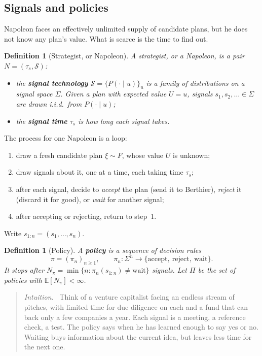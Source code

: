 \documentclass[11pt]{article}
\newcommand{\Nap}{\textcolor{nap}{Napoleon}}
\newcommand{\Ber}{\textcolor{ber}{Berthier}}
\newtheorem{definition}{Definition}
\newtheorem*{definition*}{Definition}
\theoremstyle{remark}
\newenvironment{intuition}{\begin{quote}\small\color{muted}\textit{Intuition.}\ }{\end{quote}}
\newcommand{\E}{\mathbb{E}}
\newcommand{\Scal}{\mathcal{S}}
\newcommand{\accept}{\text{accept}}
\begin{document}
\subsection{Signals and policies}

\Nap{} faces an effectively unlimited supply of candidate plans, but he does not know any plan's value. What is scarce is the time to find out.

\setcounter{definition}{0}\begin{definition}[Strategist, or \Nap]\label{def:napoleon}
A strategist, or a \Nap, is a pair $N=(\tau_s,\Scal)$:
\begin{itemize}
  \item the \textbf{signal technology} $\Scal=\{P(\cdot\mid u)\}_u$ is a family of distributions on a signal space $\Sigma$. Given a plan with expected value $U=u$, signals $s_1,s_2,\dots\in\Sigma$ are drawn i.i.d.\ from $P(\cdot\mid u)$;
  \item the \textbf{signal time} $\tau_s$ is how long each signal takes.
\end{itemize}
\end{definition}

The process for one \Nap{} is a loop:
\begin{enumerate}
  \item draw a fresh candidate plan $\xi\sim F$, whose value $U$ is unknown;
  \item draw signals about it, one at a time, each taking time $\tau_s$;
  \item after each signal, decide to \emph{accept} the plan (send it to \Ber), \emph{reject} it (discard it for good), or \emph{wait} for another signal;
  \item after accepting or rejecting, return to step~1.
\end{enumerate}
Write $s_{1:n}=(s_1,\dots,s_n)$.

\begin{definition*}[Policy]
A \textbf{policy} is a sequence of decision rules
\[
\pi=(\pi_n)_{n\ge1},\qquad\pi_n:\Sigma^n\to\{\accept,\ \text{reject},\ \text{wait}\}.
\]
It stops after $N_\pi=\min\{n:\pi_n(s_{1:n})\ne\text{wait}\}$ signals. Let $\Pi$ be the set of policies with $\E[N_\pi]<\infty$.
\end{definition*}

\begin{intuition}
Think of a venture capitalist facing an endless stream of pitches, with limited time for due diligence on each and a fund that can back only a few companies a year. Each signal is a meeting, a reference check, a test. The policy says when he has learned enough to say yes or no. Waiting buys information about the current idea, but leaves less time for the next one.
\end{intuition}
\end{document}

